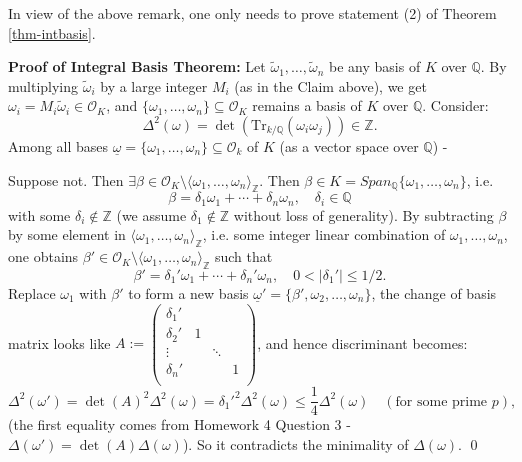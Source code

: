 \documentclass[11pt]{book}
\begin{document}
In view of the above remark, one only needs to prove statement (2) of Theorem \ref{thm-intbasis}.

\medskip
\noindent\textbf{Proof of Integral Basis Theorem:} Let $\tilde{\omega}_1, \ldots, \tilde{\omega}_n$ be any basis of $K$ over $\mathbb{Q}$. By multiplying $\tilde{\omega}_i$ by a large integer $M_i$ (as in the Claim above), we get $\omega_i = M_i \tilde{\omega}_i \in \mathcal{O}_K$, and $\{\omega_1, \ldots, \omega_n\} \subseteq \mathcal{O}_K$ remains a basis of $K$ over $\mathbb{Q}$. Consider:
$$
\Delta^2(\omega) = \det\left(\mathrm{Tr}_{k/\mathbb{Q}}(\omega_i \omega_j)\right) \in \mathbb{Z}.
$$
Among all bases $\underline{\omega} = \{\omega_1, \ldots, \omega_n\} \subseteq \mathcal{O}_k$ of $K$ (as a vector space over $\mathbb{Q}$) - 
\begin{center}
\end{center}
Suppose not. Then $\exists \beta \in \mathcal{O}_K \setminus \langle \omega_1, \ldots, \omega_n \rangle_{\mathbb{Z}}$. Then
$\beta \in K = Span_{\mathbb{Q}}\{\omega_1, \dots, \omega_n\}$, i.e. 
$$
\beta = \delta_1 \omega_1 + \cdots + \delta_n \omega_n, \quad \delta_i \in \mathbb{Q}
$$
with some $\delta_i \notin \mathbb{Z}$ (we assume $\delta_1 \notin \mathbb{Z}$ without loss of generality). By subtracting $\beta$ by some element in $\langle \omega_1, \ldots, \omega_n \rangle_{\mathbb{Z}}$, i.e. some integer linear combination of $\omega_1, \dots, \omega_n$, one obtains $\beta' \in \mathcal{O}_K \setminus \langle \omega_1, \ldots, \omega_n \rangle_{\mathbb{Z}}$ such that
$$
\beta' = \delta_1' \omega_1 + \cdots + \delta_n' \omega_n, \quad 0 < |\delta_1'| \leq 1/2.
$$
Replace $\omega_1$ with $\beta'$ to form a new basis $\underline{\omega}' = \{\beta',\omega_2,\dots,\omega_n\}$, the change of basis matrix looks like $A := \begin{pmatrix}
\delta_1' &    &  &  \\
\delta_2' & 1   &  &  \\
\vdots &  &   \ddots  &  \\
\delta_n' &    &   &  1 \\
\end{pmatrix}$, and hence discriminant becomes:
$$
\Delta^2(\omega') = \det(A)^2\Delta^2(\omega) = \delta_1'^2\Delta^2(\omega) \leq \frac{1}{4} \Delta^2(\omega) \quad (\text{for some prime } p),
$$
(the first equality comes from Homework 4 Question 3 - $\Delta(\omega') = \det(A)\Delta(\omega)$). So it contradicts the minimality of $\Delta(\omega)$. \qed
\end{document}

